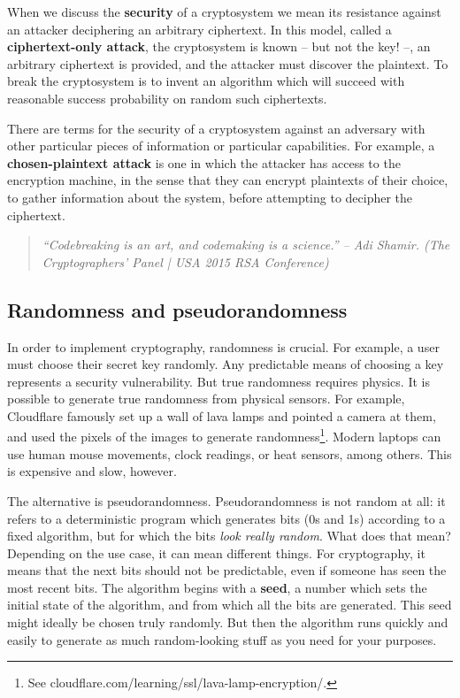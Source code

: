 \documentclass{article}
\theoremstyle{plain}
\theoremstyle{definition}
\theoremstyle{remark}
\numberwithin{theorem}{section}
\begin{document}
When we discuss the \textbf{security} of a cryptosystem we mean its resistance against an attacker deciphering an arbitrary ciphertext.  In this model, called a \textbf{ciphertext-only attack}, the cryptosystem is known -- but not the key! --, an arbitrary ciphertext is provided, and the attacker must discover the plaintext.  To break the cryptosystem is to invent an algorithm which will succeed with reasonable success probability on random such ciphertexts.

There are terms for the security of a cryptosystem against an adversary with other particular pieces of information or particular capabilities.  For example, a \textbf{chosen-plaintext attack} is one in which the attacker has access to the encryption machine, in the sense that they can encrypt plaintexts of their choice, to gather information about the system, before attempting to decipher the ciphertext.




\begin{quote}
    \emph{“Codebreaking is an art, and codemaking is a science.” – Adi Shamir. (The Cryptographers’ Panel | USA 2015 RSA Conference)}
\end{quote}

\subsection{Randomness and pseudorandomness}


In order to implement cryptography, randomness is crucial.  For example, a user must choose their secret key randomly.  Any predictable means of choosing a key represents a security vulnerability.  But true randomness requires physics.  It is possible to generate true randomness from physical sensors.  For example, Cloudflare famously set up a wall of lava lamps and pointed a camera at them, and used the pixels of the images to generate randomness\footnote{See
cloudflare.com/learning/ssl/lava-lamp-encryption/.}.  Modern laptops can use human mouse movements, clock readings, or heat sensors, among others.  This is expensive and slow, however.

The alternative is pseudorandomness.  Pseudorandomness is not random at all:  it refers to a deterministic program which generates bits (0s and 1s) according to a fixed algorithm, but for which the bits \emph{look really random}.  What does that mean?  Depending on the use case, it can mean different things.  For cryptography, it means that the next bits should not be predictable, even if someone has seen the most recent bits.  The algorithm begins with a \textbf{seed}, a number which sets the initial state of the algorithm, and from which all the bits are generated.  This seed might ideally be chosen truly randomly.  But then the algorithm runs quickly and easily to generate as much random-looking stuff as you need for your purposes.
\end{document}
